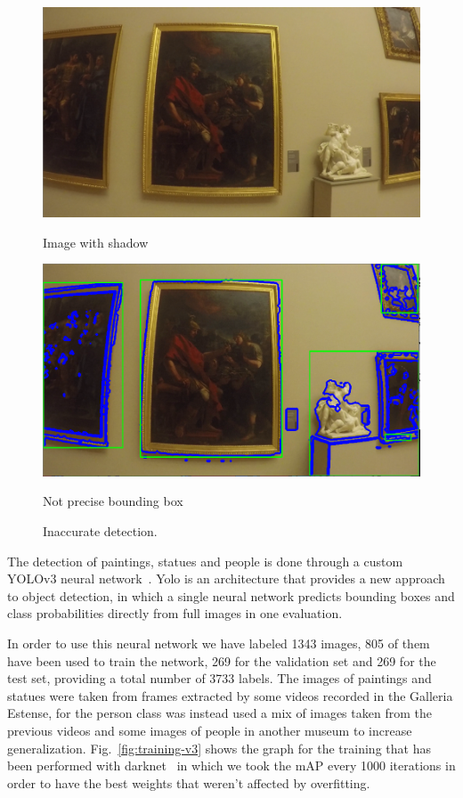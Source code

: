 \begin{figure}[h]
      \includegraphics[width=\linewidth]{pictures/painting_detection/detection_withoutNN_1.PNG}
      \caption*{Image with shadow}\label{fig:shadow1}
    \endminipage\hfill
      \includegraphics[width=\linewidth]{pictures/painting_detection/detection_withoutNN_3.PNG}
      \caption*{Not precise bounding box}\label{fig:shadow2}
    \endminipage\hfill
    \caption{Inaccurate detection.}\label{fig:innaccurate_detection}
\end{figure}







The detection of paintings, statues and people is done through a custom YOLOv3 neural network~\cite{yolov3}.
Yolo is an architecture that provides a new approach to object detection, in which a single neural network predicts bounding boxes and class probabilities directly from full images in one evaluation.

In order to use this neural network we have labeled 1343 images, 805 of them have been used to train the network, 269 for the validation set and 269 for the test set, providing a total number of 3733 labels. The images of paintings and statues were taken from frames extracted by some videos recorded in the Galleria Estense, for the person class was instead used a mix of images taken from the previous videos and some images of people in another museum to increase generalization.
Fig.~\ref{fig:training-v3} shows the graph for the training that has been performed with darknet~\cite{darknet} in which we took the mAP every 1000 iterations in order to have the best weights that weren't affected by overfitting.

